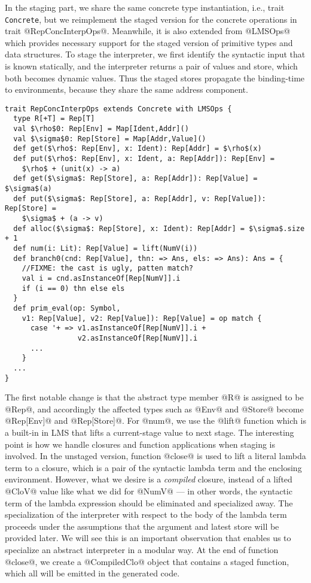 In the staging part, we share the same concrete type instantiation, i.e., trait
\texttt{Concrete}, but we reimplement the staged version for the concrete
operations in trait @RepConcInterpOps@. Meanwhile, it is also extended from
@LMSOps@ which provides necessary support for the staged version of primitive
types and data structures. To stage the interpreter, we first identify the
syntactic input that is known statically, and the interpreter returns a pair of
values and store, which both becomes dynamic values. Thus the staged stores
propagate the binding-time to environments, because they share the same address
component.

\begin{lstlisting}
trait RepConcInterpOps extends Concrete with LMSOps {
  type R[+T] = Rep[T]
  val $\rho$0: Rep[Env] = Map[Ident,Addr]()
  val $\sigma$0: Rep[Store] = Map[Addr,Value]()
  def get($\rho$: Rep[Env], x: Ident): Rep[Addr] = $\rho$(x)
  def put($\rho$: Rep[Env], x: Ident, a: Rep[Addr]): Rep[Env] = 
    $\rho$ + (unit(x) -> a)
  def get($\sigma$: Rep[Store], a: Rep[Addr]): Rep[Value] = $\sigma$(a)
  def put($\sigma$: Rep[Store], a: Rep[Addr], v: Rep[Value]): Rep[Store] = 
    $\sigma$ + (a -> v)
  def alloc($\sigma$: Rep[Store], x: Ident): Rep[Addr] = $\sigma$.size + 1
  def num(i: Lit): Rep[Value] = lift(NumV(i))
  def branch0(cnd: Rep[Value], thn: => Ans, els: => Ans): Ans = {
    //FIXME: the cast is ugly, patten match?
    val i = cnd.asInstanceOf[Rep[NumV]].i
    if (i == 0) thn else els
  }
  def prim_eval(op: Symbol, 
    v1: Rep[Value], v2: Rep[Value]): Rep[Value] = op match {
      case '+ => v1.asInstanceOf[Rep[NumV]].i + 
                 v2.asInstanceOf[Rep[NumV]].i
      ...
    }
  ...
}
\end{lstlisting}

The first notable change is that the abstract type member @R@ is assigned to be
@Rep@, and accordingly the affected types such as @Env@ and @Store@ become
@Rep[Env]@ and @Rep[Store]@. For @num@, we use the @lift@ function which is a
built-in in LMS that lifts a current-stage value to next stage. The interesting
point is how we handle closures and function applications when staging is
involved. In the unstaged version, function @close@ is used to lift a literal
lambda term to a closure, which is a pair of the syntactic lambda term and the
enclosing environment. However, what we desire is a \textit{compiled} closure,
instead of a lifted @CloV@ value like what we did for @NumV@ --- in other words,
the syntactic term of the lambda expression should be eliminated and specialized
away. The specialization of the interpreter with respect to the body of the
lambda term proceeds under the assumptions that the argument and latest store
will be provided later.
We will see this is an important observation that enables us to specialize an
abstract interpreter in a modular way. At the end of function @close@, we create
a @CompiledClo@ object that contains a staged function, which all will be
emitted in the generated code.

